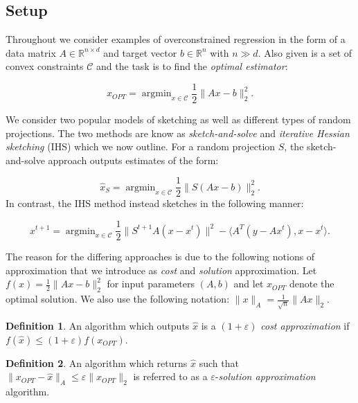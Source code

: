 \documentclass[twoside]{article}
\newcommand{\R}{\mathbb{R}}
\newcommand{\eps}{\varepsilon}
\theoremstyle{definition}\newtheorem{thm}{Theorem}[section]
\theoremstyle{definition}\newtheorem{mydef}[thm]{Definition}
\theoremstyle{definition}\newtheorem{rem}[thm]{Remark}
\theoremstyle{definition}\newtheorem{prop}[thm]{Proposition}
\theoremstyle{definition}\newtheorem{example}[thm]{Example}
\theoremstyle{definition}\newtheorem{claim}[thm]{Claim}
\theoremstyle{definition}\newtheorem{Qu}[thm]{Question}
\theoremstyle{definition}\newtheorem{Lemma}[thm]{Lemma}
\theoremstyle{definition}\newtheorem{Cor}[thm]{Corollary}
\theoremstyle{definition}\newtheorem{Fact}[]{Fact}
\DeclareMathOperator*{\argmin}{argmin}
\begin{document}
\subsection{Setup}
Throughout we consider examples of overconstrained regression in the form of
a data matrix $A \in \R^{n \times d}$ and target vector $b \in \R^{n}$ with
$n \gg d$.
Also given is a set of convex constraints $\mathcal{C}$ and the task is to
find the \textit{optimal estimator}:

\begin{equation}
  x_{OPT} = \argmin_{x \in \mathcal{C}} \frac{1}{2} \|Ax-b\|_2^2.
\end{equation}

We consider two popular models of sketching as well as different types
of random projections.
The two methods are know as \textit{sketch-and-solve} and \textit{iterative
Hessian sketching} (IHS) which we now outline.
For a random projection $S$, the sketch-and-solve approach outputs estimates
of the form:

\begin{equation} \label{eq: sketch-and-solve}
  \hat{x}_S = \argmin_{x \in \mathcal{C}} \frac{1}{2} \|S(Ax-b)\|_2^2.
\end{equation}
\noindent In contrast, the IHS method instead sketches in the following manner:

\begin{equation} \label{eq: ihs}
  x^{t+1} = \argmin_{x \in \mathcal{C}}  \frac{1}{2} \|S^{t+1} A
  (x - x^t) \|^2 - \langle A^T (y - Ax^t), x - x^t \rangle.
\end{equation}

The reason for the differing approaches is due to the following notions of
approximation that we introduce as \textit{cost} and \textit{solution}
approximation.
Let $f(x) = \frac{1}{2}\|Ax-b\|_2^2$ for input parameters $(A,b)$ and let
$x_{OPT}$ denote the optimal solution.
We also use the following notation: $\|x\|_A = \frac{1}{\sqrt{n}}\|Ax\|_2$.

\begin{mydef} \label{def: cost-approx}
  An algorithm which outputs $\hat{x}$ is a $(1 + \eps)$ \textit{cost
   approximation} if $f(\hat{x}) \le (1+\eps) f(x_{OPT})$.
\end{mydef}

\begin{mydef} \label{def: sol-approx}
  An algorithm which returns $\hat{x}$ such that $\|x_{OPT} - \hat{x}\|_A
  \le \eps \|x_{OPT}\|_2$ is referred to as a $\eps$-\textit{solution
  approximation} algorithm.
\end{mydef}
\end{document}
